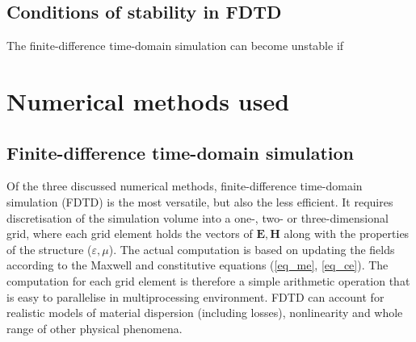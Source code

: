 \documentclass[letterpaper,12pt]{report}
\begin{document}

\subsection{Conditions of stability in FDTD}
The finite-difference time-domain simulation can become unstable if 


\section{Numerical methods used}
\subsection{Finite-difference time-domain simulation}
Of the three discussed numerical methods, finite-difference time-domain simulation (FDTD) is the most versatile, but also the less efficient. It requires discretisation of the simulation volume into a one-, two- or three-dimensional grid, where each grid element holds the vectors of $\mathbf E, \mathbf H$ along with the properties of the structure ($\varepsilon, \mu$). The actual computation is based on updating the fields according to the Maxwell and constitutive equations (\ref{eq_me}, \ref{eq_ce}). The computation for each grid element is therefore a simple arithmetic operation that is easy to parallelise in multiprocessing environment. FDTD can account for realistic models of material dispersion (including losses), nonlinearity and whole range of other physical phenomena.
\end{document}
